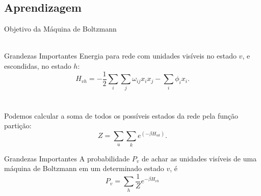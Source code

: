 \subsection{Aprendizagem}%
\begin{frame}{Objetivo da Máquina de Boltzmann}%
  \justiying%
  \\~\\

\end{frame}

\begin{frame}{Grandezas Importantes}%
  \justifying%
  Energia para rede com unidades visíveis no estado $v$, e escondidas, no estado $h$:
  \begin{equation}%
    \label{eq:bm-energy}
    H_{vh} = -\frac{1}{2} \sum_{i} \sum_{j} \omega_{ij} x_{i} x_{j} - \sum_{i} \phi_{i} x_{i}.
  \end{equation}
  \\~\\
  Podemos calcular a soma de todos os possíveis estados da rede pela função partição:
  \begin{equation}%
    \label{eq:bm-partition}
    Z = \sum_{u} \sum_{k} e^{(-\beta H_{uk})}.
  \end{equation}
\end{frame}

\begin{frame}{Grandezas Importantes}%
  A probabilidade $P_{v}$ de achar as unidades visíveis de uma máquina de Boltzmann em um determinado estado $v$, é
  \begin{equation}%
    \label{eq:bm-prob-marg}%
    P_{v} = \sum_{h} \frac{1}{Z} e^{-\beta H_{vh}}
  \end{equation}
\end{frame}


